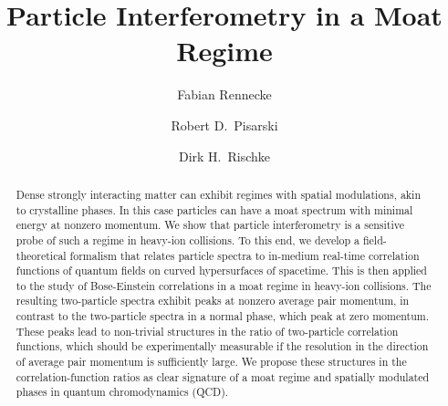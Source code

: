 \documentclass[reprint,superscriptaddress,english,preprintnumbers,amsmath,amssymb,aps,prx]{revtex4-2}
\begin{document}
\title{Particle Interferometry in a Moat Regime}

\author{Fabian Rennecke}

\author{Robert D.\ Pisarski}

\author{Dirk H.\ Rischke}


\begin{abstract}
Dense strongly interacting matter can exhibit regimes with spatial modulations, akin to crystalline phases. In this case particles can have a moat spectrum with minimal energy at nonzero momentum. We show that particle interferometry is a sensitive probe of such a regime in heavy-ion collisions. To this end,   
we develop a field-theoretical formalism 
that relates particle spectra to in-medium real-time correlation functions of quantum fields on curved hypersurfaces of spacetime.
This is then applied to the study of Bose-Einstein correlations in a moat regime in heavy-ion collisions. The resulting two-particle spectra exhibit peaks at nonzero average pair momentum, in contrast to the
two-particle spectra in a normal phase, which peak at zero momentum. These peaks lead to non-trivial
structures in the ratio
of two-particle correlation functions, which should be experimentally measurable if the resolution in the direction of average pair momentum is sufficiently large. We propose these structures in the correlation-function ratios as clear signature of a moat regime and spatially modulated phases in quantum chromodynamics (QCD). 
\end{abstract}

\maketitle



\end{document}
